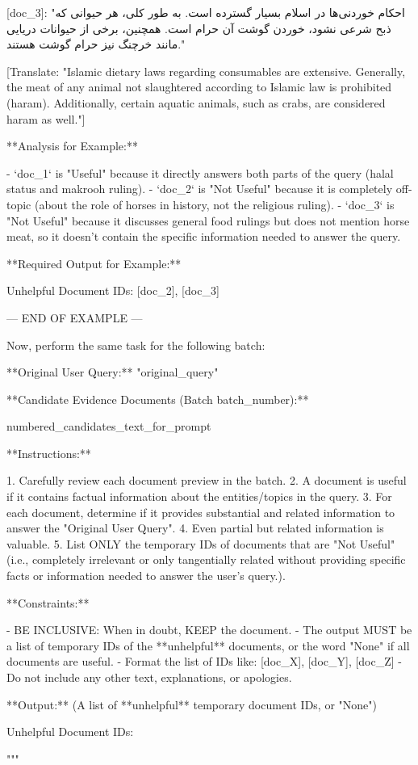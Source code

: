 \documentclass[11pt]{article}
\begin{document}
\begin{PromptBlock}

[doc_3]: "احکام خوردنی‌ها در اسلام بسیار گسترده است. به طور کلی، هر حیوانی که ذبح شرعی نشود، خوردن گوشت آن حرام است. همچنین، برخی از حیوانات دریایی مانند خرچنگ نیز حرام گوشت هستند."

[Translate: "Islamic dietary laws regarding consumables are extensive. Generally, the meat of any animal not slaughtered according to Islamic law is prohibited (haram). Additionally, certain aquatic animals, such as crabs, are considered haram as well."]

**Analysis for Example:**

- `doc_1` is "Useful" because it directly answers both parts of the query (halal status and makrooh ruling).
- `doc_2` is "Not Useful" because it is completely off-topic (about the role of horses in history, not the religious ruling).
- `doc_3` is "Not Useful" because it discusses general food rulings but does not mention horse meat, so it doesn't contain the specific information needed to answer the query.

**Required Output for Example:**

Unhelpful Document IDs: [doc_2], [doc_3]

--- END OF EXAMPLE ---

Now, perform the same task for the following batch:

**Original User Query:** "{original_query}"

**Candidate Evidence Documents (Batch {batch_number}):**

{numbered_candidates_text_for_prompt}

**Instructions:**

1. Carefully review each document preview in the batch.
2. A document is useful if it contains factual information about the entities/topics in the query.
3. For each document, determine if it provides substantial and related information to answer the "Original User Query".
4. Even partial but related information is valuable.
5. List ONLY the temporary IDs of documents that are "Not Useful" (i.e., completely irrelevant or only tangentially related without providing specific facts or information needed to answer the user's query.).

**Constraints:**

- BE INCLUSIVE: When in doubt, KEEP the document.
- The output MUST be a list of temporary IDs of the **unhelpful** documents, or the word "None" if all documents are useful.
- Format the list of IDs like: [doc_X], [doc_Y], [doc_Z]
- Do not include any other text, explanations, or apologies.

**Output:** (A list of **unhelpful** temporary document IDs, or "None")

Unhelpful Document IDs:

"""
\end{PromptBlock}
\end{document}
